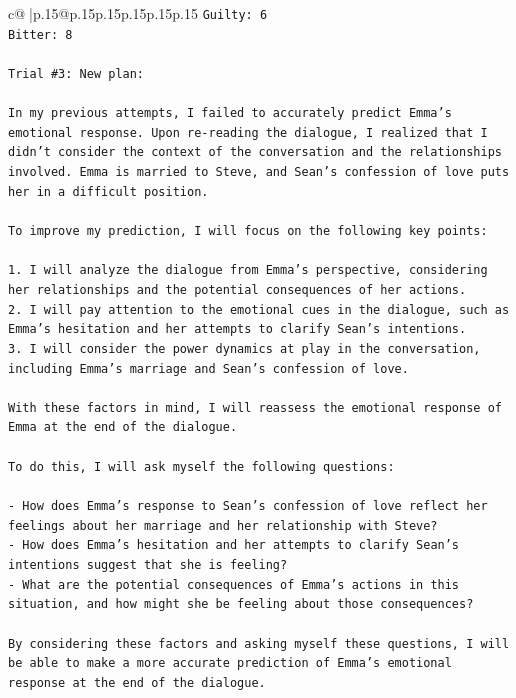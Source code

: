 \documentclass{article}
\begin{document}
{\begin{supertabular}{c@{$\;$}|p{.15\linewidth}@{}p{.15\linewidth}p{.15\linewidth}p{.15\linewidth}p{.15\linewidth}p{.15\linewidth}}
{{{\texttt{Guilty: 6} \\
\texttt{Bitter: 8} \\
\\ 
\texttt{Trial \#3: New plan: } \\
\\ 
\texttt{In my previous attempts, I failed to accurately predict Emma's emotional response. Upon re{-}reading the dialogue, I realized that I didn't consider the context of the conversation and the relationships involved. Emma is married to Steve, and Sean's confession of love puts her in a difficult position. } \\
\\ 
\texttt{To improve my prediction, I will focus on the following key points:} \\
\\ 
\texttt{1.  I will analyze the dialogue from Emma's perspective, considering her relationships and the potential consequences of her actions.} \\
\texttt{2.  I will pay attention to the emotional cues in the dialogue, such as Emma's hesitation and her attempts to clarify Sean's intentions.} \\
\texttt{3.  I will consider the power dynamics at play in the conversation, including Emma's marriage and Sean's confession of love.} \\
\\ 
\texttt{With these factors in mind, I will reassess the emotional response of Emma at the end of the dialogue.} \\
\\ 
\texttt{To do this, I will ask myself the following questions:} \\
\\ 
\texttt{{-} How does Emma's response to Sean's confession of love reflect her feelings about her marriage and her relationship with Steve?} \\
\texttt{{-} How does Emma's hesitation and her attempts to clarify Sean's intentions suggest that she is feeling?} \\
\texttt{{-} What are the potential consequences of Emma's actions in this situation, and how might she be feeling about those consequences?} \\
\\ 
\texttt{By considering these factors and asking myself these questions, I will be able to make a more accurate prediction of Emma's emotional response at the end of the dialogue.} \\
\\ 
}}}
\end{supertabular}}
\end{document}
